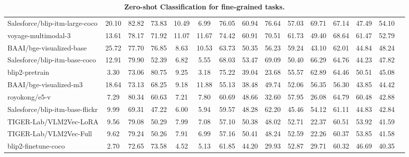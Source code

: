 \begin{table*}
{\begin{tabular}{lcccccccccccccc}
Salesforce/blip-itm-large-coco &20.10 &82.82 &73.83 &10.49 &6.99 &76.05 &60.94 &76.64 &57.03 &69.71 &67.14 &47.49 &54.10 \\
voyage-multimodal-3 &13.61 &78.17 &71.92 &11.07 &11.67 &74.42 &60.91 &70.51 &61.73 &49.40 &68.64 &61.47 &52.79 \\
BAAI/bge-visualized-base &25.72 &77.70 &76.85 &8.63 &10.53 &63.73 &50.35 &56.23 &59.24 &43.10 &62.01 &44.84 &48.24 \\
Salesforce/blip-itm-base-coco &12.91 &79.90 &52.39 &6.82 &5.55 &68.03 &53.47 &69.09 &50.40 &66.29 &64.76 &44.23 &47.82 \\
blip2-pretrain &3.30 &73.06 &80.75 &9.25 &3.18 &75.22 &39.04 &23.68 &55.57 &62.89 &64.46 &50.51 &45.08 \\
BAAI/bge-visualized-m3 &18.64 &73.13 &68.25 &9.18 &11.88 &55.13 &38.48 &49.74 &52.06 &56.35 &56.30 &43.85 &44.42 \\
royokong/e5-v &7.29 &80.34 &60.63 &7.21 &7.80 &60.69 &48.66 &32.60 &57.95 &26.08 &64.79 &60.48 &42.88 \\
Salesforce/blip-itm-base-flickr &9.99 &69.31 &47.22 &6.00 &5.94 &59.57 &48.28 &62.20 &45.46 &54.12 &61.11 &44.83 &42.84 \\
TIGER-Lab/VLM2Vec-LoRA &9.56 &79.08 &50.29 &7.99 &7.08 &57.10 &50.38 &48.02 &52.71 &22.37 &60.51 &53.92 &41.59 \\
TIGER-Lab/VLM2Vec-Full &9.62 &79.24 &50.26 &7.91 &6.99 &57.16 &50.41 &48.24 &52.59 &22.26 &60.37 &53.85 &41.58 \\
blip2-finetune-coco &2.70 &72.65 &73.58 &4.52 &5.13 &61.85 &44.20 &29.93 &52.87 &29.71 &60.32 &46.69 &40.35 \\
\bottomrule
\end{tabular}}
\caption{\textbf{Zero-shot Classification for fine-grained tasks.}}\label{tab: zeroshot fine}
\end{table*}